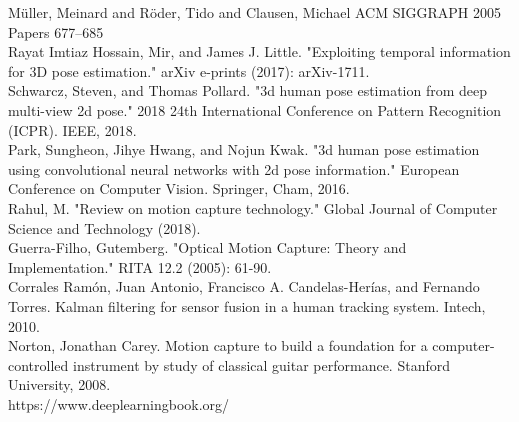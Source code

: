 \begin{thebibliography}{9}

M{\"u}ller, Meinard and R{\"o}der, Tido and Clausen, Michael ACM SIGGRAPH 2005 Papers 677--685\\

Rayat Imtiaz Hossain, Mir, and James J. Little. "Exploiting temporal information for 3D pose estimation." arXiv e-prints (2017): arXiv-1711.\\

Schwarcz, Steven, and Thomas Pollard. "3d human pose estimation from deep multi-view 2d pose." 2018 24th International Conference on Pattern Recognition (ICPR). IEEE, 2018.\\

Park, Sungheon, Jihye Hwang, and Nojun Kwak. "3d human pose estimation using convolutional neural networks with 2d pose information." European Conference on Computer Vision. Springer, Cham, 2016.\\

Rahul, M. "Review on motion capture technology." Global Journal of Computer Science and Technology (2018).\\

Guerra-Filho, Gutemberg. "Optical Motion Capture: Theory and Implementation." RITA 12.2 (2005): 61-90.\\

Corrales Ramón, Juan Antonio, Francisco A. Candelas-Herías, and Fernando Torres. Kalman filtering for sensor fusion in a human tracking system. Intech, 2010.\\

 Norton, Jonathan Carey. Motion capture to build a foundation for a computer-controlled instrument by study of classical guitar performance. Stanford University, 2008.\\
 
https://www.deeplearningbook.org/\\


\end{thebibliography}
